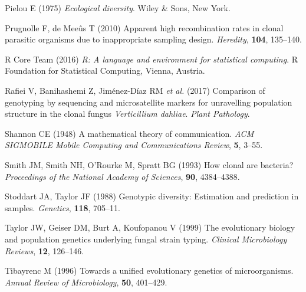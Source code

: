 \documentclass[]{article}
\theoremstyle{definition}
\theoremstyle{definition}
\theoremstyle{definition}
\theoremstyle{remark}
\begin{document}
\hypertarget{ref-pielou1975ecological}{}
Pielou E (1975) \emph{Ecological diversity}. Wiley \& Sons, New York.

\hypertarget{ref-prugnolle2010apparent}{}
Prugnolle F, de Meeûs T (2010) Apparent high recombination rates in
clonal parasitic organisms due to inappropriate sampling design.
\emph{Heredity}, \textbf{104}, 135--140.

\hypertarget{ref-R2016}{}
R Core Team (2016) \emph{R: A language and environment for statistical
computing}. R Foundation for Statistical Computing, Vienna, Austria.

\hypertarget{ref-rafiei2017comparison}{}
Rafiei V, Banihashemi Z, Jiménez-Díaz RM \emph{et al.} (2017) Comparison
of genotyping by sequencing and microsatellite markers for unravelling
population structure in the clonal fungus \emph{Verticillium dahliae}.
\emph{Plant Pathology}.

\hypertarget{ref-shannon2001mathematical}{}
Shannon CE (1948) A mathematical theory of communication. \emph{ACM
SIGMOBILE Mobile Computing and Communications Review}, \textbf{5},
3--55.

\hypertarget{ref-smith1993how}{}
Smith JM, Smith NH, O'Rourke M, Spratt BG (1993) How clonal are
bacteria? \emph{Proceedings of the National Academy of Sciences},
\textbf{90}, 4384--4388.

\hypertarget{ref-stoddart1988genotypic}{}
Stoddart JA, Taylor JF (1988) Genotypic diversity: Estimation and
prediction in samples. \emph{Genetics}, \textbf{118}, 705--11.

\hypertarget{ref-taylor1999evolutionary}{}
Taylor JW, Geiser DM, Burt A, Koufopanou V (1999) The evolutionary
biology and population genetics underlying fungal strain typing.
\emph{Clinical Microbiology Reviews}, \textbf{12}, 126--146.

\hypertarget{ref-tibayrenc1996towards}{}
Tibayrenc M (1996) Towards a unified evolutionary genetics of
microorganisms. \emph{Annual Review of Microbiology}, \textbf{50},
401--429.
\end{document}
